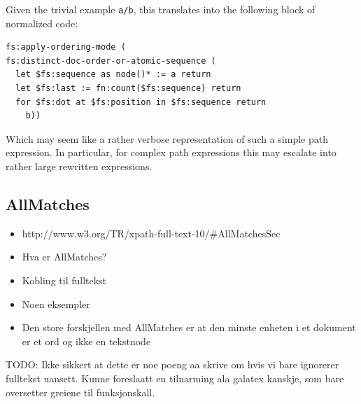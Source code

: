 Given the trivial example \verb!a/b!, this translates into the following block
of normalized code:

\begin{verbatim}
fs:apply-ordering-mode (
fs:distinct-doc-order-or-atomic-sequence (
  let $fs:sequence as node()* := a return
  let $fs:last := fn:count($fs:sequence) return
  for $fs:dot at $fs:position in $fs:sequence return
    b))
\end{verbatim}

Which may seem like a rather verbose representation of such a simple path
expression. In particular, for complex path expressions this may
escalate into rather large rewritten expressions.

\subsection{AllMatches}
\label{sect:theory:xquery:allmatches}
\begin{itemize}
  \item http://www.w3.org/TR/xpath-full-text-10/\#AllMatchesSec
  \item Hva er AllMatches?
  \item Kobling til fulltekst
  \item Noen eksempler
  \item Den store forskjellen med AllMatches er at den minste enheten i et 
        dokument er et ord og ikke en tekstnode
\end{itemize}
TODO: Ikke sikkert at dette er noe poeng aa skrive om hvis vi bare ignorerer
fulltekst uansett. Kunne foreslaatt en tilnarming ala galatex kanskje, som bare
oversetter greiene til funksjonskall.
